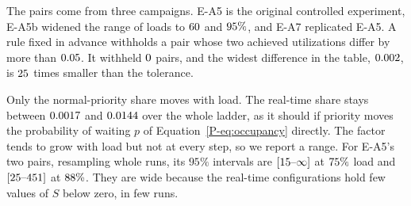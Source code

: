 \documentclass[10pt,journal,onecolumn]{IEEEtran}
\newcommand{\kafka}{Kafka}
\begin{document}
The pairs come from three campaigns. E-A5 is the original controlled experiment, E-A5b widened the range of
loads to $60$ and $95\%$, and E-A7 replicated E-A5. A rule fixed in advance
withholds a pair whose two achieved utilizations differ by more than $0.05$. It withheld
$0$ pairs, and the widest difference in the table, $0.002$, is $25$
times smaller than the tolerance.

\begin{table}[htbp]
\caption{\textbf{Factor of $\rtFactorLow$ to $\rtFactorHigh$ on \kafka{}, with utilization matched
in every pair.} Normal-priority and real-time shares of $S$ below zero at the same achieved utilization,
and the factor between them, on both brokers, from three campaigns, with a $95\%$ interval that
resamples whole runs in brackets, rounded outward ($\infty$: no upper end). Every cell is $\prioEventsLo$ to
$\prioEventsHi$ matched events. Both configurations' achieved $\rho$ is printed so that the
controlled experiment can be checked pair by pair. Generated at build time from the campaign files.}
\label{stab:priority}
\centering
\footnotesize

\end{table}

Only the normal-priority share moves with load. The real-time share stays between $0.0017$
and $0.0144$ over the whole ladder, as it should if priority moves the probability of waiting $p$ of
Equation~\ref{P-eq:occupancy} directly. The factor tends to grow with load but not at every step,
so we report a range. For E-A5's two pairs, resampling whole runs, its $95\%$ intervals
are $[\rtLowFactorRunCI]$ at $75\%$ load and $[\rtHighFactorRunCI]$ at
$88\%$. They are wide because the real-time configurations hold few values of $S$
below zero, in few runs.
\end{document}
